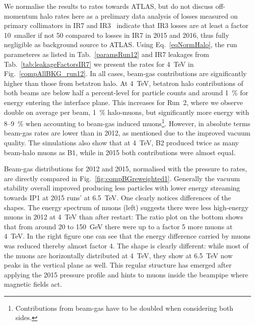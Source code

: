 We normalise the results to rates towards ATLAS, but do not discuss off-momentum halo rates here as a prelimary data analysis of losses measured on primary collimators in IR7 and IR3~\cite{belenOffMom} indicate that IR3 losses are at least a factor 10~smaller if not 50 compared to losses in IR7 in 2015 and 2016, thus fully negligible as background source to ATLAS. Using Eq.~\ref{eqNormHalo}, the run parameteres as listed in Tab.~\ref{paramsRun12} and IR7 leakages from Tab.~\ref{tab:leakageFactorsIR7} we present the rates for 4~TeV in Fig.~\ref{compAllBKG_run12}. In all cases, beam-gas contributions are significantly higher than those from betatron halo. At 4~TeV, betatron halo contributions of both beams are below half a percent-level for particle counts and around 1~\% for energy entering the interface plane. This increases for Run~2, where we observe double on average per beam, 1~\% halo-muons, but significantly more energy with 8--9~\% when accounting to beam-gas induced muons\footnote{Contributions from beam-gas have to be doubled when considering both sides.}. However, in absolute terms beam-gas rates are lower than in 2012, as mentioned due to the improved vacuum quality. The simulations also show that at 4~TeV, B2 produced twice as many beam-halo muons as B1, while in 2015 both contributions were almost equal. 

Beam-gas distributions for 2012 and 2015, normalised with the pressure to rates, are directly compared in Fig.~\ref{fig:compBGreweighted1}. Generally the vacuum stability overall improved producing less particles with lower energy streaming towards IP1 at 2015 runs' at 6.5~TeV. One clearly notices differences of the shapes. The energy spectrum of muons (left) suggests there were less high-energy muons in 2012 at 4~TeV than after restart: The ratio plot on the bottom shows that from around 20 to 150~GeV there were up to a factor 5 more muons at 4~TeV. In the right figure one can see that the energy difference carried by muons was reduced thereby almost factor 4. The shape is clearly different: while most of the muons are horizontally distributed at 4~TeV, they show at 6.5~TeV now peaks in the vertical plane as well. This regular structure has emerged after applying the 2015 pressure profile and hints to muons inside the beampipe where magnetic fields act. 



